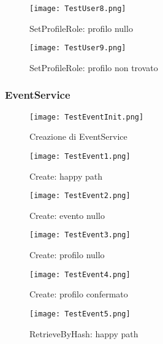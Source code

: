 \begin{figure}[h!]
    \begin{center}
        \texttt{[image: TestUser8.png]}
        \caption{SetProfileRole: profilo nullo}
    \end{center}
\end{figure}
\begin{figure}[h!]
    \begin{center}
        \texttt{[image: TestUser9.png]}
        \caption{SetProfileRole: profilo non trovato}
    \end{center}
\end{figure}
\clearpage

\subsubsection{EventService}
\begin{figure}[h!]
    \begin{center}
        \texttt{[image: TestEventInit.png]}
        \caption{Creazione di EventService}
    \end{center}
\end{figure}
\begin{figure}[h!]
    \begin{center}
        \texttt{[image: TestEvent1.png]}
        \caption{Create: happy path}
    \end{center}
\end{figure}
\begin{figure}[h!]
    \begin{center}
        \texttt{[image: TestEvent2.png]}
        \caption{Create: evento nullo}
    \end{center}
\end{figure}
\begin{figure}[h!]
    \begin{center}
        \texttt{[image: TestEvent3.png]}
        \caption{Create: profilo nullo}
    \end{center}
\end{figure}
\begin{figure}[h!]
    \begin{center}
        \texttt{[image: TestEvent4.png]}
        \caption{Create: profilo confermato}
    \end{center}
\end{figure}
\begin{figure}[h!]
    \begin{center}
        \texttt{[image: TestEvent5.png]}
        \caption{RetrieveByHash: happy path}
    \end{center}
\end{figure}
